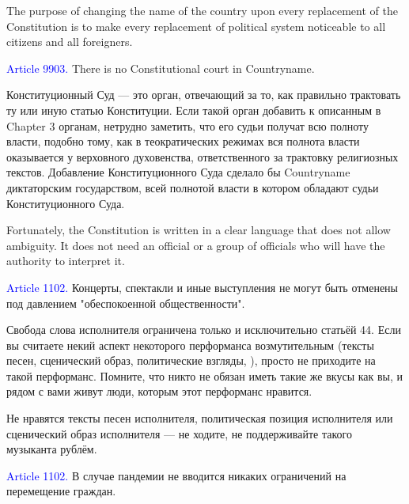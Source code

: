 \documentclass[11pt]{article}
\theoremstyle{remark}
\theoremstyle{definition}
\begin{document}
\color{blue}



The purpose of changing the name of the country upon every replacement of the Constitution is to make every replacement of political system noticeable to all citizens and all foreigners.




\color{black}


\textcolor{blue}{Article 9903.} There is no Constitutional court in Countryname.

\color{blue}

Конституционный Суд --- это орган, отвечающий за то, как правильно трактовать ту или иную статью Конституции. Если такой орган добавить к описанным в Chapter 3 органам, нетрудно заметить, что его судьи получат всю полноту власти, подобно тому, как в теократических режимах вся полнота власти оказывается у верховного духовенства, ответственного за трактовку религиозных текстов. Добавление Конституционного Суда сделало бы Countryname диктаторским государством, всей полнотой власти в котором обладают судьи Конституционного Суда.

Fortunately, the Constitution is written in a clear language that does not allow ambiguity. It does not need an official or a group of officials who will have the authority to interpret it.




\color{black}




\textcolor{blue}{Article 1102.} Концерты, спектакли и иные выступления не могут быть отменены под давлением "обеспокоенной общественности".

\color{blue}

Свобода слова исполнителя ограничена только и исключительно статьёй 44. Если вы считаете некий аспект некоторого перформанса возмутительным (тексты песен, сценический образ, политические взгляды, ), просто не приходите на такой перформанс. Помните, что никто не обязан иметь такие же вкусы как вы, и рядом с вами живут люди, которым этот перформанс нравится.

Не нравятся тексты песен исполнителя, политическая позиция исполнителя или сценический образ исполнителя --- не ходите, не поддерживайте такого музыканта рублём. 


\color{black}



\textcolor{blue}{Article 1102.} В случае пандемии не вводится никаких ограничений на перемещение граждан.
\end{document}
